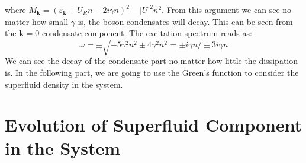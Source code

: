 \documentclass{article}
\newcommand{\tmmathbf}[1]{\ensuremath{\boldsymbol{#1}}}
\begin{document}
where $M_{\tmmathbf{k}} = (\varepsilon_{\tmmathbf{k}} + U_R n - 2 i \gamma
n)^2 - | U |^2 n^2$. From this argument we can see no matter how small
$\gamma$ is, the boson condensates will decay. This can be seen from the
$\tmmathbf{k}= 0$ condensate component. The excitation spectrum reads as:
\begin{equation}
  \omega = \pm \sqrt{- 5 \gamma^2 n^2 \pm 4 \gamma^2 n^2} = \pm i \gamma n /
  \pm 3 i \gamma n
\end{equation}
We can see the decay of the condensate part no matter how little the
dissipation is. In the following part, we are going to use the Green's
function to consider the superfluid density in the system.

\section{Evolution of Superfluid Component in the System}
\end{document}
